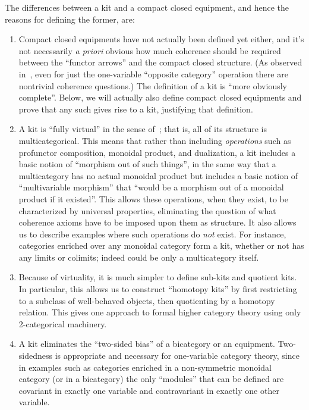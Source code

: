 \documentclass{amsart}
\begin{document}
The differences between a kit and a compact closed equipment, and hence the reasons for defining the former, are:
\begin{enumerate}
\item Compact closed equipments have not actually been defined yet either, and it's not necessarily \emph{a priori} obvious how much coherence should be required between the ``functor arrows'' and the compact closed structure.
  (As observed in~\cite{shulman:contravariance}, even for just the one-variable ``opposite category'' operation there are nontrivial coherence questions.)
  The definition of a kit is ``more obviously complete''.
  Below, we will actually also define compact closed equipments and prove that any such gives rise to a kit, justifying that definition.
\item A kit is ``fully virtual'' in the sense of~\cite{cs:multicats}; that is, all of its structure is multicategorical.
  This means that rather than including \emph{operations} such as profunctor composition, monoidal product, and dualization, a kit includes a basic notion of ``morphism out of such things'', in the same way that a multicategory has no actual monoidal product but includes a basic notion of ``multivariable morphism'' that ``would be a morphism out of a monoidal product if it existed''.
  This allows these operations, when they exist, to be characterized by universal properties, eliminating the question of what coherence axioms have to be imposed upon them as structure.
  It also allows us to describe examples where such operations do \emph{not} exist.
  For instance, categories enriched over any monoidal category \bV form a kit, whether or not \bV has any limits or colimits; indeed \bV could be only a multicategory itself.
\item Because of virtuality, it is much simpler to define sub-kits and quotient kits.
  In particular, this allows us to construct ``homotopy kits'' by first restricting to a subclass of well-behaved objects, then quotienting by a homotopy relation.
  This gives one approach to formal higher category theory using only 2-categorical machinery.
\item A kit eliminates the ``two-sided bias'' of a bicategory or an equipment.
  Two-sidedness is appropriate and necessary for one-variable category theory, since in examples such as categories enriched in a non-symmetric monoidal category (or in a bicategory) the only ``modules'' that can be defined are covariant in exactly one variable and contravariant in exactly one other variable.

\end{enumerate}
\end{document}
